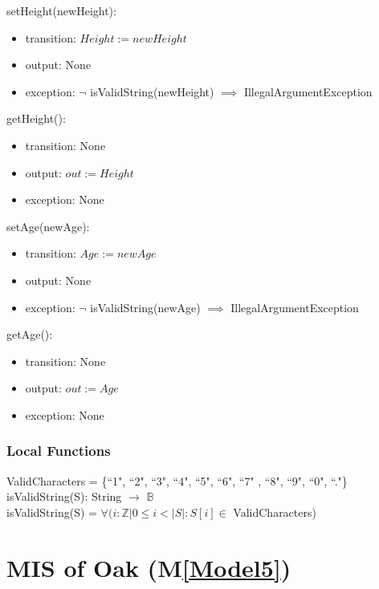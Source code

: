\documentclass[12pt, titlepage]{article}
\newcommand{\mref}[1]{M\ref{#1}}
\begin{document}
\noindent setHeight(newHeight):
\begin{itemize}
\item transition: $\mathit{Height := newHeight}$
\item output: None
\item exception: $\neg$ isValidString(newHeight) $\implies$
IllegalArgumentException
\end{itemize}

\noindent getHeight():
\begin{itemize}
\item transition: None
\item output: $\mathit{out := Height}$
\item exception: None
\end{itemize}

\noindent setAge(newAge):
\begin{itemize}
\item transition: $\mathit{Age := newAge}$
\item output: None
\item exception: $\neg$ isValidString(newAge) $\implies$
IllegalArgumentException
\end{itemize}

\noindent getAge():
\begin{itemize}
\item transition: None
\item output: $\mathit{out := Age}$
\item exception: None
\end{itemize}

\subsubsection{Local Functions}
ValidCharacters = \{``1", ``2", ``3", ``4", ``5", ``6", ``7"
, ``8", ``9", ``0", ``."\}\\

\noindent isValidString(S): String $\rightarrow$ $\mathbb{B}$ \\

\noindent isValidString(S) = $\forall(i : \mathbb{Z} | 0 \leq
i < |S| : S[i] \in $ ValidCharacters)

\newpage

\renewcommand{\tn}{Oak }
\renewcommand{\tmn}{Oak}
\renewcommand{\constn}{Oak}

\section{MIS of \tn (\mref{Model5})}
\end{document}
